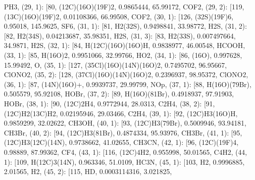 \documentclass[letterpaper,10pt,english]{sphinxmanual}
\begin{document}
\begin{fulllineitems}
\textquotesingle{}PH3\textquotesingle{}{]}, (29, 1): {[}80, \textquotesingle{}(12C)(16O)(19F)2\textquotesingle{}, 0.9865444, 65.99172, \textquotesingle{}COF2\textquotesingle{}{]}, (29, 2): {[}119, \textquotesingle{}(13C)(16O)(19F)2\textquotesingle{}, 0.01108366, 66.99508, \textquotesingle{}COF2\textquotesingle{}{]}, (30, 1): {[}126, \textquotesingle{}(32S)(19F)6\textquotesingle{}, 0.95018, 145.9625, \textquotesingle{}SF6\textquotesingle{}{]}, (31, 1): {[}81, \textquotesingle{}H2(32S)\textquotesingle{}, 0.9498841, 33.98772, \textquotesingle{}H2S\textquotesingle{}{]}, (31, 2): {[}82, \textquotesingle{}H2(34S)\textquotesingle{}, 0.04213687, 35.98351, \textquotesingle{}H2S\textquotesingle{}{]}, (31, 3): {[}83, \textquotesingle{}H2(33S)\textquotesingle{}, 0.007497664, 34.9871, \textquotesingle{}H2S\textquotesingle{}{]}, (32, 1): {[}84, \textquotesingle{}H(12C)(16O)(16O)H\textquotesingle{}, 0.9838977, 46.00548, \textquotesingle{}HCOOH\textquotesingle{}{]}, (33, 1): {[}85, \textquotesingle{}H(16O)2\textquotesingle{}, 0.9951066, 32.99766, \textquotesingle{}HO2\textquotesingle{}{]}, (34, 1): {[}86, \textquotesingle{}(16O)\textquotesingle{}, 0.997628, 15.99492, \textquotesingle{}O\textquotesingle{}{]}, (35, 1): {[}127, \textquotesingle{}(35Cl)(16O)(14N)(16O)2\textquotesingle{}, 0.7495702, 96.95667, \textquotesingle{}ClONO2\textquotesingle{}{]}, (35, 2): {[}128, \textquotesingle{}(37Cl)(16O)(14N)(16O)2\textquotesingle{}, 0.2396937, 98.95372, \textquotesingle{}ClONO2\textquotesingle{}{]}, (36, 1): {[}87, \textquotesingle{}(14N)(16O)+\textquotesingle{}, 0.9939737, 29.99799, \textquotesingle{}NOp\textquotesingle{}{]}, (37, 1): {[}88, \textquotesingle{}H(16O)(79Br)\textquotesingle{}, 0.505579, 95.92108, \textquotesingle{}HOBr\textquotesingle{}{]}, (37, 2): {[}89, \textquotesingle{}H(16O)(81Br)\textquotesingle{}, 0.4918937, 97.91903, \textquotesingle{}HOBr\textquotesingle{}{]}, (38, 1): {[}90, \textquotesingle{}(12C)2H4\textquotesingle{}, 0.9772944, 28.0313, \textquotesingle{}C2H4\textquotesingle{}{]}, (38, 2): {[}91, \textquotesingle{}(12C)H2(13C)H2\textquotesingle{}, 0.02195946, 29.03466, \textquotesingle{}C2H4\textquotesingle{}{]}, (39, 1): {[}92, \textquotesingle{}(12C)H3(16O)H\textquotesingle{}, 0.9859299, 32.02622, \textquotesingle{}CH3OH\textquotesingle{}{]}, (40, 1): {[}93, \textquotesingle{}(12C)H3(79Br)\textquotesingle{}, 0.5009946, 93.94181, \textquotesingle{}CH3Br\textquotesingle{}{]}, (40, 2): {[}94, \textquotesingle{}(12C)H3(81Br)\textquotesingle{}, 0.4874334, 95.93976, \textquotesingle{}CH3Br\textquotesingle{}{]}, (41, 1): {[}95, \textquotesingle{}(12C)H3(12C)(14N)\textquotesingle{}, 0.9738662, 41.02655, \textquotesingle{}CH3CN\textquotesingle{}{]}, (42, 1): {[}96, \textquotesingle{}(12C)(19F)4\textquotesingle{}, 0.98889, 87.99362, \textquotesingle{}CF4\textquotesingle{}{]}, (43, 1): {[}116, \textquotesingle{}(12C)4H2\textquotesingle{}, 0.955998, 50.01565, \textquotesingle{}C4H2\textquotesingle{}{]}, (44, 1): {[}109, \textquotesingle{}H(12C)3(14N)\textquotesingle{}, 0.963346, 51.0109, \textquotesingle{}HC3N\textquotesingle{}{]}, (45, 1): {[}103, \textquotesingle{}H2\textquotesingle{}, 0.9996885, 2.01565, \textquotesingle{}H2\textquotesingle{}{]}, (45, 2): {[}115, \textquotesingle{}HD\textquotesingle{}, 0.0003114316, 3.021825, 
\end{fulllineitems}
\end{document}
